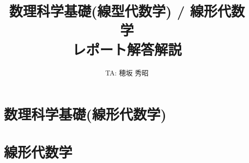 \documentclass{jsbook}
\begin{document}
\frontmatter

\title{数理科学基礎(線型代数学) / 線形代数学\\レポート解答解説}
\author{TA: 穂坂 秀昭}

\maketitle

\tableofcontents

\mainmatter

\part{数理科学基礎(線形代数学)}\label{part1}



\part{線形代数学}\label{part2}
\end{document}
